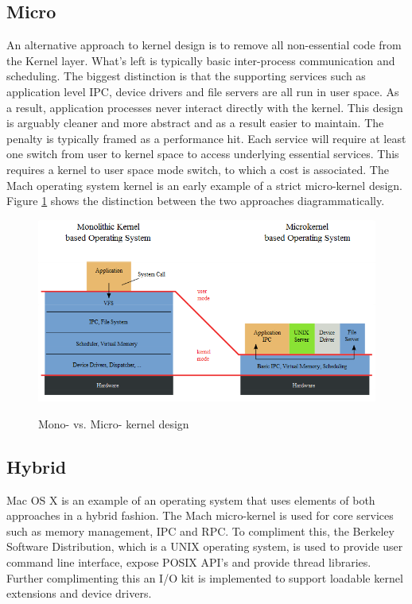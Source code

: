 \documentclass[10pt,a4paper]{article}
\begin{document}
\subsection{Micro}
An alternative approach to kernel design is to remove all non-essential code from the Kernel layer. What's left is typically basic inter-process communication and scheduling. The biggest distinction is that the supporting services such as application level IPC, device drivers and file servers are all run in user space. As a result, application processes never interact directly with the kernel. This design is arguably cleaner and more abstract and as a result easier to maintain. The penalty is typically framed as a performance hit. Each service will require at least one switch from user to kernel space to access underlying essential services. This requires a kernel to user space mode switch, to which a cost is associated. The Mach operating system kernel is an early example of a strict micro-kernel design. Figure \ref{monomicro} shows the distinction between the two approaches diagrammatically. 
\begin{figure}
\caption{Mono- vs. Micro- kernel design}
\begin{center}
\includegraphics[scale=0.45]{../images/mono-vs-micro.png}
\label{monomicro}
\end{center}
\end{figure}
\subsection{Hybrid}
Mac OS X is an example of an operating system that uses elements of both approaches in a hybrid fashion. The Mach micro-kernel is used for core services such as memory management, IPC and RPC. To compliment this, the Berkeley Software Distribution, which is a UNIX operating system, is used to provide user command line interface, expose POSIX API's and provide thread libraries. Further complimenting this an I/O kit is implemented to support loadable kernel extensions and device drivers.  
\end{document}
